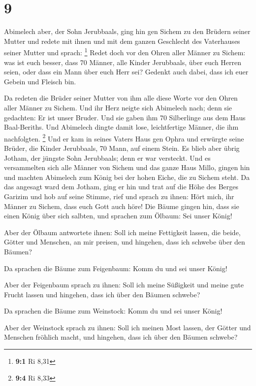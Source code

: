 \hypertarget{section-2}{%
\section{9}\label{section-2}}

 Abimelech aber, der Sohn Jerubbaals, ging hin gen Sichem zu
den Brüdern seiner Mutter und redete mit ihnen und mit dem ganzen
Geschlecht des Vaterhauses seiner Mutter und sprach: \footnote{\textbf{9:1}
  Ri 8,31}  Redet doch vor den Ohren aller Männer zu Sichem:
was ist euch besser, dass 70 Männer, alle Kinder Jerubbaals, über euch
Herren seien, oder dass ein Mann über euch Herr sei? Gedenkt auch dabei,
dass ich euer Gebein und Fleisch bin.

 Da redeten die Brüder seiner Mutter von ihm alle diese
Worte vor den Ohren aller Männer zu Sichem. Und ihr Herz neigte sich
Abimelech nach; denn sie gedachten: Er ist unser Bruder. 
Und sie gaben ihm 70 Silberlinge aus dem Haus Baal-Beriths. Und
Abimelech dingte damit lose, leichtfertige Männer, die ihm nachfolgten.
\footnote{\textbf{9:4} Ri 8,33}  Und er kam in seines Vaters
Haus gen Ophra und erwürgte seine Brüder, die Kinder Jerubbaals, 70
Mann, auf einem Stein. Es blieb aber übrig Jotham, der jüngste Sohn
Jerubbaals; denn er war versteckt.  Und es versammelten sich
alle Männer von Sichem und das ganze Haus Millo, gingen hin und machten
Abimelech zum König bei der hohen Eiche, die zu Sichem steht.
 Da das angesagt ward dem Jotham, ging er hin und trat auf
die Höhe des Berges Garizim und hob auf seine Stimme, rief und sprach zu
ihnen: Hört mich, ihr Männer zu Sichem, dass euch Gott auch höre!
 Die Bäume gingen hin, dass sie einen König über sich
salbten, und sprachen zum Ölbaum: Sei unser König!

 Aber der Ölbaum antwortete ihnen: Soll ich meine Fettigkeit
lassen, die beide, Götter und Menschen, an mir preisen, und hingehen,
dass ich schwebe über den Bäumen?

 Da sprachen die Bäume zum Feigenbaum: Komm du und sei
unser König!

 Aber der Feigenbaum sprach zu ihnen: Soll ich meine
Süßigkeit und meine gute Frucht lassen und hingehen, dass ich über den
Bäumen schwebe?

 Da sprachen die Bäume zum Weinstock: Komm du und sei unser
König!

 Aber der Weinstock sprach zu ihnen: Soll ich meinen Most
lassen, der Götter und Menschen fröhlich macht, und hingehen, dass ich
über den Bäumen schwebe?

